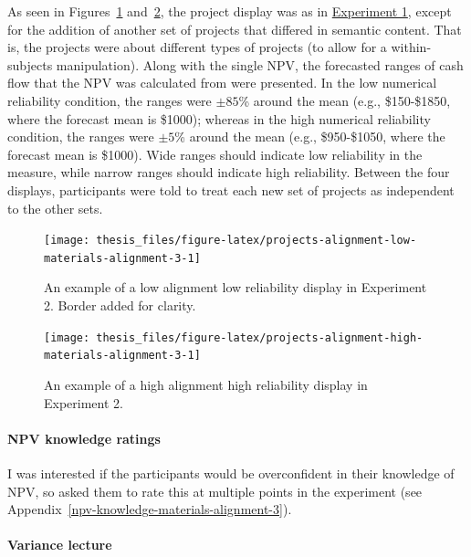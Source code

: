 \documentclass[a4paper, nobind, dvipsnames]{templates/ociamthesis}
\theoremstyle{definition}
\theoremstyle{definition}
\theoremstyle{definition}
\theoremstyle{definition}
\theoremstyle{remark}
\begin{document}
As seen in Figures~\ref{fig:projects-alignment-low-materials-alignment-3}
and~\ref{fig:projects-alignment-high-materials-alignment-3}, the project
display was as in \protect\hyperlink{projects-materials-alignment-2}{Experiment 1}, except for
the addition of another set of projects that differed in semantic content. That
is, the projects were about different types of projects (to allow for a
within-subjects manipulation). Along with the single NPV, the forecasted ranges
of cash flow that the NPV was calculated from were presented. In the low
numerical reliability condition, the ranges were \(\pm85\)\% around the mean (e.g.,
\$150-\$1850, where the forecast mean is \$1000); whereas in the high numerical
reliability condition, the ranges were \(\pm5\)\% around the mean (e.g.,
\$950-\$1050, where the forecast mean is \$1000). Wide ranges should indicate low
reliability in the measure, while narrow ranges should indicate high
reliability. Between the four displays, participants were told to treat each new
set of projects as independent to the other sets.



\begin{figure}
\texttt{[image: thesis\_files/figure-latex/projects-alignment-low-materials-alignment-3-1]} \caption{An example of a low alignment low reliability display in Experiment 2. Border added for clarity.}\label{fig:projects-alignment-low-materials-alignment-3}
\end{figure}



\begin{figure}
\texttt{[image: thesis\_files/figure-latex/projects-alignment-high-materials-alignment-3-1]} \caption{An example of a high alignment high reliability display in Experiment 2.}\label{fig:projects-alignment-high-materials-alignment-3}
\end{figure}

\paragraph{NPV knowledge ratings}

I was interested if the participants would be overconfident in their knowledge
of NPV, so asked them to rate this at multiple points in the experiment (see
Appendix~\ref{npv-knowledge-materials-alignment-3}).

\paragraph{Variance lecture}
\end{document}
